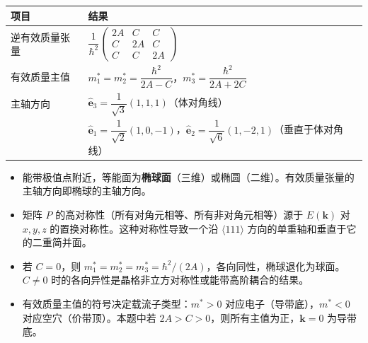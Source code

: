 \begin{formulabox}[答案汇总]
\begin{center}
\begin{tabular}{ll}
\toprule
\textbf{项目} & \textbf{结果} \\
\midrule
逆有效质量张量 & $\dfrac{1}{\hbar^2}\begin{pmatrix}2A&C&C\\C&2A&C\\C&C&2A\end{pmatrix}$ \\
有效质量主值 & $m_1^*=m_2^*=\dfrac{\hbar^2}{2A-C}$，$m_3^*=\dfrac{\hbar^2}{2A+2C}$ \\
主轴方向 & $\hat{\bm{e}}_3=\dfrac{1}{\sqrt{3}}(1,1,1)$（体对角线） \\
 & $\hat{\bm{e}}_1=\dfrac{1}{\sqrt{2}}(1,0,-1)$，$\hat{\bm{e}}_2=\dfrac{1}{\sqrt{6}}(1,-2,1)$（垂直于体对角线） \\
\bottomrule
\end{tabular}
\end{center}
\end{formulabox}

\begin{insightbox}[物理图像]
\begin{itemize}
    \item 能带极值点附近，等能面为\textbf{椭球面}（三维）或椭圆（二维）。有效质量张量的主轴方向即椭球的主轴方向。
    \item 矩阵 $P$ 的高对称性（所有对角元相等、所有非对角元相等）源于 $E(\bm{k})$ 对 $x,y,z$ 的置换对称性。这种对称性导致一个沿 $\langle111\rangle$ 方向的单重轴和垂直于它的二重简并面。
    \item 若 $C=0$，则 $m_1^*=m_2^*=m_3^*=\hbar^2/(2A)$，各向同性，椭球退化为球面。$C\neq0$ 时的各向异性是晶格非立方对称性或能带高阶耦合的结果。
    \item 有效质量主值的符号决定载流子类型：$m^*>0$ 对应电子（导带底），$m^*<0$ 对应空穴（价带顶）。本题中若 $2A>C>0$，则所有主值为正，$\bm{k}=0$ 为导带底。
\end{itemize}
\end{insightbox}
